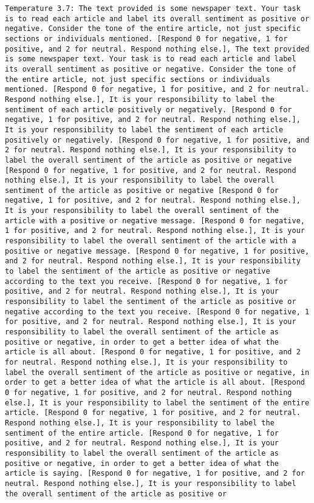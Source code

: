 \begin{lstlisting}[label=lst:poor_performing_prompts]
	Temperature 3.7: The text provided is some newspaper text. Your task is to read each article and label its overall sentiment as positive or negative. Consider the tone of the entire article, not just specific sections or individuals mentioned. [Respond 0 for negative, 1 for positive, and 2 for neutral. Respond nothing else.], The text provided is some newspaper text. Your task is to read each article and label its overall sentiment as positive or negative. Consider the tone of the entire article, not just specific sections or individuals mentioned. [Respond 0 for negative, 1 for positive, and 2 for neutral. Respond nothing else.], It is your responsibility to label the sentiment of each article positively or negatively. [Respond 0 for negative, 1 for positive, and 2 for neutral. Respond nothing else.], It is your responsibility to label the sentiment of each article positively or negatively. [Respond 0 for negative, 1 for positive, and 2 for neutral. Respond nothing else.], It is your responsibility to label the overall sentiment of the article as positive or negative [Respond 0 for negative, 1 for positive, and 2 for neutral. Respond nothing else.], It is your responsibility to label the overall sentiment of the article as positive or negative [Respond 0 for negative, 1 for positive, and 2 for neutral. Respond nothing else.], It is your responsibility to label the overall sentiment of the article with a positive or negative message. [Respond 0 for negative, 1 for positive, and 2 for neutral. Respond nothing else.], It is your responsibility to label the overall sentiment of the article with a positive or negative message. [Respond 0 for negative, 1 for positive, and 2 for neutral. Respond nothing else.], It is your responsibility to label the sentiment of the article as positive or negative according to the text you receive. [Respond 0 for negative, 1 for positive, and 2 for neutral. Respond nothing else.], It is your responsibility to label the sentiment of the article as positive or negative according to the text you receive. [Respond 0 for negative, 1 for positive, and 2 for neutral. Respond nothing else.], It is your responsibility to label the overall sentiment of the article as positive or negative, in order to get a better idea of what the article is all about. [Respond 0 for negative, 1 for positive, and 2 for neutral. Respond nothing else.], It is your responsibility to label the overall sentiment of the article as positive or negative, in order to get a better idea of what the article is all about. [Respond 0 for negative, 1 for positive, and 2 for neutral. Respond nothing else.], It is your responsibility to label the sentiment of the entire article. [Respond 0 for negative, 1 for positive, and 2 for neutral. Respond nothing else.], It is your responsibility to label the sentiment of the entire article. [Respond 0 for negative, 1 for positive, and 2 for neutral. Respond nothing else.], It is your responsibility to label the overall sentiment of the article as positive or negative, in order to get a better idea of what the article is saying. [Respond 0 for negative, 1 for positive, and 2 for neutral. Respond nothing else.], It is your responsibility to label the overall sentiment of the article as positive or 
\end{lstlisting}
